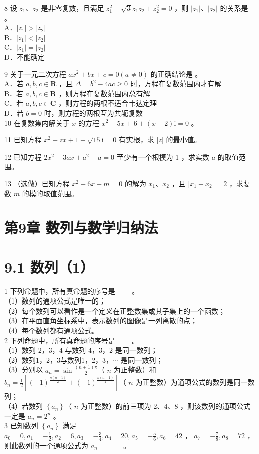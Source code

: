 \documentclass[10pt]{article}
\begin{document}
8 设 \(z_{1} 、 z_{2}\) 是非零复数，且满足 \(z_{1}^{2}-\sqrt{3} z_{1} z_{2}+z_{2}^{2}=0\) ，则 \(\left|z_{1}\right| 、\left|z_{2}\right|\) 的关系是 。\\
A．\(\left|z_{1}\right|>\left|z_{2}\right|\)\\
B．\(\left|z_{1}\right|<\left|z_{2}\right|\)\\
C．\(\left|z_{1}\right|=\left|z_{2}\right|\)\\
D．不能确定

9 关于一元二次方程 \(a x^{2}+b x+c=0(a \neq 0)\) 的正确结论是 。\\
A．若 \(a, b, c \in \mathbf{R}\) ，且 \(\Delta=b^{2}-4 a c \geqslant 0\) 时，方程在复数范围内才有解\\
B．若 \(a, b, c \in \mathbf{R}\) ，则方程在复数范围内总有解\\
C．若 \(a, b, c \in \mathbf{C}\) ，则方程的两根不适合韦达定理\\
D．若 \(b=0\) 时，则方程的两根互为共轭复数\\
10 在复数集内解关于 \(x\) 的方程 \(x^{2}-5 x+6+(x-2) \mathrm{i}=0\) 。

11 已知方程 \(x^{2}-z x+1-\sqrt{15} \mathrm{i}=0\) 有实根，求 \(|z|\) 的最小值。

12 已知方程 \(2 x^{2}-3 a x+a^{2}-a=0\) 至少有一个根模为 1 ，求实数 \(a\) 的取值范围。

13 （选做）已知方程 \(x^{2}-6 x+m=0\) 的解为 \(x_{1} 、 x_{2}\) ，且 \(\left|x_{1}-x_{2}\right|=2\) ，求复数 \(m\) 的模的取值范围。

\section*{第9章 数列与数学归纳法}
\section*{9.1 数列（1）}
1 下列命题中，所有真命题的序号是 \(\qquad\)。\\
（1）数列的通项公式是唯一的；\\
（2）每个数列可以看作是一个定义在正整数集或其子集上的一个函数；\\
（3）在平面直角坐标系中，表示数列的图像是一列离散的点；\\
（4）每个数列都有通项公式。\\
2 下列命题中，所有真命题的序号是 \(\qquad\)。\\
（1）数列 2，3，4 与数列 4，3，2 是同一数列；\\
（2）数列1，2，3与数列1，2，3，\(\cdots\) 是同一数列；\\
（3）分别以 \(a_{n}=\sin \frac{(n+1) \pi}{2}\)（ \(n\) 为正整数）和 \(b_{n}=\frac{1}{2}\left[(-1)^{\frac{n(n+1)}{2}}+(-1)^{\frac{n(n-1)}{2}}\right]\)（ \(n\) 为正整数）为通项公式的数列是同一数列；\\
（4）若数列 \(\left\{a_{n}\right\}\)（ \(n\) 为正整数）的前三项为 \(2 、 4 、 8\) ，则该数列的通项公式一定是 \(a_{n}=2^{n}\) 。\\
3 已知数列 \(\left\{a_{n}\right\}\) 满足 \(a_{0}=0, a_{1}=-\frac{1}{2}, a_{2}=6, a_{3}=-\frac{3}{4}, a_{4}=20, a_{5}=-\frac{5}{6}, a_{6}=42\) ， \(a_{7}=-\frac{7}{8}, a_{8}=72\) ，则此数列的一个通项公式为 \(a_{n}=\) \(\qquad\)。
\end{document}
